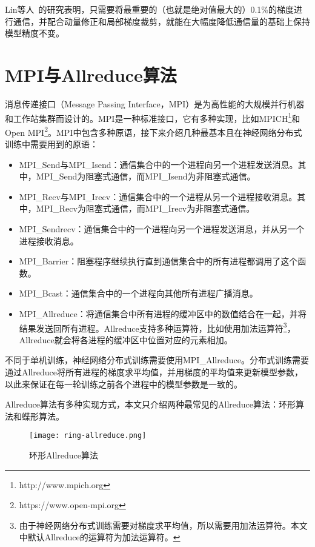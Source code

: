 Lin等人~\cite{lin2017deep}的研究表明，只需要将最重要的（也就是绝对值最大的）0.1\%的梯度进行通信，并配合动量修正和局部梯度裁剪，就能在大幅度降低通信量的基础上保持模型精度不变。

\section{MPI与Allreduce算法}
\label{section:MPI-Allreduce}
消息传递接口（Message Passing Interface，MPI）是为高性能的大规模并行机器和工作站集群而设计的。MPI是一种标准接口，它有多种实现，比如MPICH\footnote{http://www.mpich.org}和Open MPI\footnote{https://www.open-mpi.org}。MPI中包含多种原语，接下来介绍几种最基本且在神经网络分布式训练中需要用到的原语：
\begin{itemize}
    \item MPI\_Send与MPI\_Isend：通信集合中的一个进程向另一个进程发送消息。其中，MPI\_Send为阻塞式通信，而MPI\_Isend为非阻塞式通信。
    \item MPI\_Recv与MPI\_Irecv：通信集合中的一个进程从另一个进程接收消息。其中，MPI\_Recv为阻塞式通信，而MPI\_Irecv为非阻塞式通信。
    \item MPI\_Sendrecv：通信集合中的一个进程向另一个进程发送消息，并从另一个进程接收消息。
    \item MPI\_Barrier：阻塞程序继续执行直到通信集合中的所有进程都调用了这个函数。
    \item MPI\_Bcast：通信集合中的一个进程向其他所有进程广播消息。
    \item MPI\_Allreduce：将通信集合中所有进程的缓冲区中的数值结合在一起，并将结果发送回所有进程。Allreduce支持多种运算符，比如使用加法运算符\footnote{由于神经网络分布式训练需要对梯度求平均值，所以需要用加法运算符。本文中默认Allreduce的运算符为加法运算符。}，Allreduce就会将各进程的缓冲区中位置对应的元素相加。
\end{itemize}

不同于单机训练，神经网络分布式训练需要使用MPI\_Allreduce。分布式训练需要通过Allreduce将所有进程的梯度求平均值，并用梯度的平均值来更新模型参数，以此来保证在每一轮训练之前各个进程中的模型参数是一致的。

Allreduce算法有多种实现方式，本文只介绍两种最常见的Allreduce算法：环形算法和蝶形算法。


\begin{figure}[ht] %
    \centering
    \texttt{[image: ring-allreduce.png]}
    \caption{环形Allreduce算法}
    \label{fig:ring-allreduce}
\end{figure}

